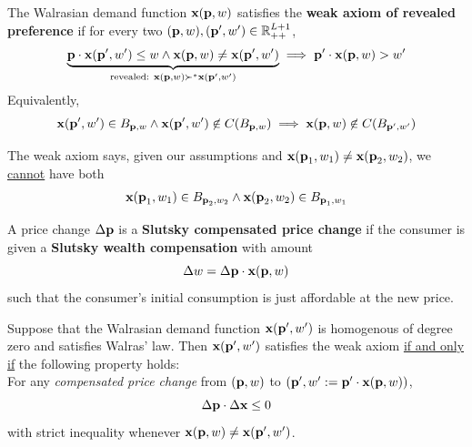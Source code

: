 \documentclass{article}
\begin{document}
 			\begin{definition}[2.F.1]
 				The Walrasian demand function $\textbf{x}(\textbf{p}, w)$ satisfies the \textbf{weak axiom of revealed preference} if for every two $(\textbf{p}, w), (\textbf{p}', w') \in \mathbb{R}_{++}^{L+1}$,
 				\begin{gather}
 					\underbrace{\textbf{p} \cdot \textbf{x}(\textbf{p}', w') \leq w
 					\land \textbf{x}(\textbf{p}, w) \neq \textbf{x}(\textbf{p}', w')}_{\text{{revealed: }} \textbf{x}(\textbf{p}, w) \succ^* \textbf{x}(\textbf{p}', w')}
 					\implies \textbf{p}' \cdot \textbf{x}(\textbf{p}, w) > w'
 				\end{gather}
 				Equivalently,
 				\begin{equation}
 					\vex(\vep', w') \in B_{\vep, w} \land \vex(\vep', w') \centernot \in C(B_{\vep, w}) \implies \vex(\vep, w) \centernot \in C(B_{\vep', w'})
 				\end{equation}
 			\end{definition}
 			
 			\begin{corollary}
 				The weak axiom says, given our assumptions and $\textbf{x}(\textbf{p}_1, w_1) \neq \textbf{x}(\textbf{p}_2, w_2)$, we \ul{cannot} have both 
 				\begin{equation}
 					\textbf{x}(\textbf{p}_1, w_1) \in B_{\textbf{p}_2, w_2} \land \textbf{x}(\textbf{p}_2, w_2) \in B_{\textbf{p}_1, w_1}
 				\end{equation}
 			\end{corollary}
 			
 			\begin{definition}
 				A price change $\Delta \textbf{p}$ is a \textbf{Slutsky compensated price change} if the consumer is given a \textbf{Slutsky wealth compensation} with amount
 				\begin{equation}
 					\Delta w = \Delta \textbf{p} \cdot \textbf{x}(\textbf{p}, w)
 				\end{equation}
 				such that the consumer's initial consumption is just affordable at the new price.
 			\end{definition}
 			
 			\begin{proposition}[2.F.1]
 				Suppose that the Walrasian demand function $\textbf{x}(\textbf{p}', w')$ is homogenous of degree zero and satisfies Walras' law. Then $\textbf{x}(\textbf{p}', w')$ satisfies the weak axiom \ul{if and only if} the following property holds: \\
 				For any \emph{compensated price change} from $(\textbf{p}, w)$ to $(\textbf{p}', w' := \textbf{p}' \cdot \textbf{x}(\textbf{p}, w))$,
 				\begin{equation}
 					\Delta \textbf{p} \cdot \Delta \textbf{x} \leq 0
 				\end{equation}
 				with strict inequality whenever $\textbf{x}(\textbf{p}, w) \neq \textbf{x}(\textbf{p}', w')$.
 			\end{proposition}
 			
\end{document}
